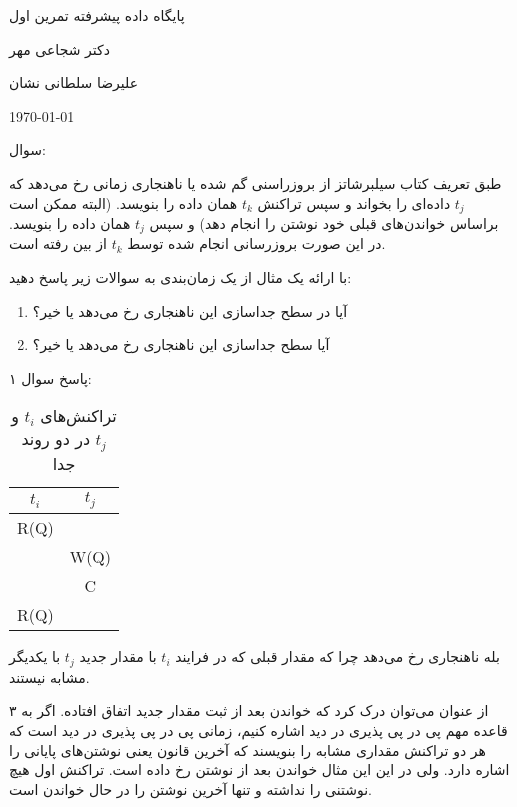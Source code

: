 \documentclass[a4paper]{article}
\begin{document}
\centerline{پایگاه داده پیشرفته تمرین اول}
\centerline{دکتر شجاعی مهر}
\centerline{علیرضا سلطانی نشان}
\centerline{\today}

سوال: 

طبق تعریف کتاب سیلبرشاتز از بروزراسنی گم شده یا  ناهنجاری زمانی
رخ می‌دهد که $t_{j}$ داده‌ای را بخواند و سپس تراکنش $t_{k}$ همان داده را بنویسد.
(البته ممکن است براساس خواندن‌های قبلی خود نوشتن را انجام دهد) و سپس $t_{j}$
همان داده‌ را بنویسد. در این صورت بروزرسانی انجام شده توسط $t_{k}$ از بین رفته
است.

با ارائه یک مثال از یک زمان‌بندی به سوالات زیر پاسخ دهید:

\begin{enumerate}
    \item آیا در سطح جداسازی  این ناهنجاری رخ می‌دهد یا خیر؟
    \item آیا سطح جداسازی  این ناهنجاری رخ می‌دهد یا خیر؟
\end{enumerate}

پاسخ سوال ۱:


\begin{LTR}
    \begin{table}[h]
        \centering
        \begin{RTL}
            \caption{تراکنش‌های $t_{i}$ و $t_{j}$ در دو روند جدا}
        \end{RTL}
        \begin{tabular}{|c|c|}
            \hline
            $t_{i}$ & $t_{j}$ \\ \hline
            R(Q) & \\ \hline
             & W(Q) \\ \hline
             & C \\ \hline
            R(Q) &  \\ \hline
        \end{tabular}
    \end{table}
\end{LTR}

بله ناهنجاری رخ می‌دهد چرا که مقدار قبلی که در فرایند $t_{i}$ با مقدار جدید
$t_{j}$ با یکدیگر مشابه نیستند.

از عنوان می‌توان درک کرد که خواندن بعد از ثبت مقدار جدید اتفاق افتاده. اگر به ۳
قاعده مهم پی در پی پذیری در دید اشاره کنیم، زمانی پی در پی پذیری در دید است که
هر دو تراکنش مقداری مشابه را بنویسند که آخرین قانون یعنی نوشتن‌های پایانی را
اشاره دارد. ولی در این این مثال خواندن بعد از نوشتن رخ داده است. تراکنش اول هیچ
نوشتنی را نداشته و تنها آخرین نوشتن را در حال خواندن است.
\end{document}
